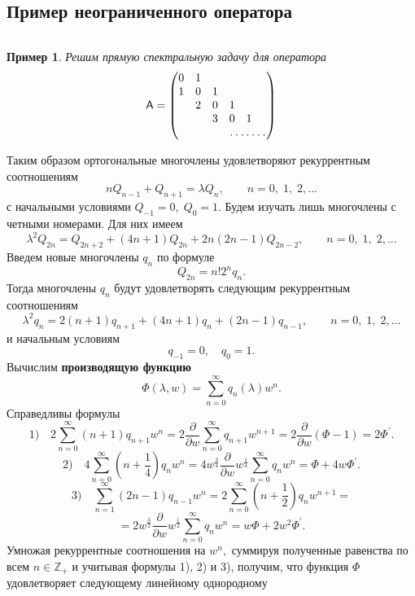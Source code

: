\documentclass[12pt,a4paper]{article}
\theoremstyle{plain}   \newtheorem{Pro}{Задача}
\newtheorem{Exa}{Пример}
\begin{document}
\subsection{Пример неограниченного оператора}
$ \; $
\\
\begin{Exa}
Решим прямую спектральную задачу для оператора
\begin{equation*}
  \mathsf{A}=
    \begin{pmatrix}
	  0 & 1 & \; & \; & \;& \;  \\
	  1 & 0 & 1 & \; & \; & \; \\
	  \; & 2 & 0 & 1 & \; & \; \\
	  \; & \; & 3 & 0 & 1 & \; \\
	  \; & \; & \; & \hdotsfor{3}
	\end{pmatrix}
\end{equation*}
\end{Exa}
Таким образом ортогональные многочлены удовлетворяют
рекуррентным соотношениям
$$
  nQ_{n-1}+Q_{n+1}=\lambda Q_n ,
  \qquad n=0, \; 1, \; 2,...
$$
с начальными условиями
$ Q_{-1}=0, \; Q_0 =1. $
Будем изучать лишь многочлены с четными номерами. Для них имеем
$$
  \lambda ^2 Q_{2n}=Q_{2n+2}+(4n+1)Q_{2n}+2n(2n-1)Q_{2n-2},
  \qquad n=0, \; 1, \; 2,...
$$
Введем новые многочлены
$ q_n $
по формуле
$$
  Q_{2n}=n!2^n q_n .
$$
Тогда многочлены
$ q_n $
будут удовлетворять следующим рекуррентным соотношениям
$$
  \lambda ^2 q_n =2(n+1)q_{n+1}+(4n+1)q_n +(2n-1)q_{n-1},
  \qquad n=0, \; 1, \; 2,...
$$
и начальным условиям
$$
  q_{-1}=0, \quad q_0 =1.
$$
Вычислим
{\bfseries производящую функцию}
$$
  \Phi (\lambda , w)=\sum _{n=0}^{\infty}
  q_n (\lambda )w^n .
$$
Справедливы формулы
$$
  1) \quad 2\sum _{n=0}^{\infty} (n+1)q_{n+1}w^n =
  2 \frac{\partial}{\partial w} \sum _{n=0}^{\infty}
  q_{n+1}w^{n+1}=2\frac{\partial}{\partial w}
  (\Phi -1)=2\Phi ^{\prime}.
$$
$$
  2) \quad 4\sum _{n=0}^{\infty}(n+\frac{1}{4})q_n w^n =
  4w^{\frac{3}{4}}\frac{\partial}{\partial w}
  w^{\frac{1}{4}}\sum _{n=0}^{\infty}q_n w^n =
  \Phi +4w\Phi ^{\prime}.
$$
$$
  3) \quad \sum _{n=1}^{\infty}(2n-1)q_{n-1}w^n =
  2\sum _{n=0}^{\infty}(n+\frac{1}{2})q_n w^{n+1}=
$$
$$
  =2w^{\frac{3}{2}} \frac{\partial}{\partial w}
  w^{\frac{1}{2}} \sum _{n=0}^{\infty}q_n w^n =
  w\Phi +2w^2 \Phi ^{\prime}.
$$
Умножая рекуррентные соотношения на
$ w^n , $
суммируя полученные равенства по всем
$ n \in \mathbb{Z}_+ $
и учитывая формулы 1), 2) и 3), получим, что функция
$ \Phi $
удовлетворяет следующему линейному однородному
\end{document}
